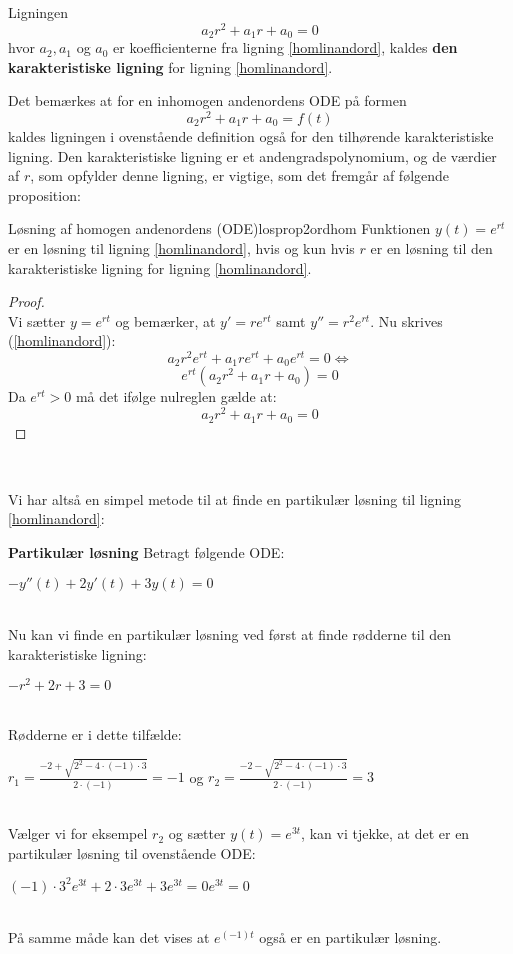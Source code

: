 \begin{definition}
Ligningen 
$$a_2r^2+a_1r+a_0=0$$
hvor $a_2, a_1$ og $a_0$ er koefficienterne fra ligning \eqref{homlinandord}, kaldes \textbf{den karakteristiske ligning} for ligning \eqref{homlinandord}.
\end{definition} 
\hfill \break
Det bemærkes at for en inhomogen andenordens ODE på formen
$$a_2r^2+a_1r+a_0=f(t)$$
kaldes ligningen i ovenstående definition også for den tilhørende karakteristiske ligning.
Den  karakteristiske ligning er et andengradspolynomium, og de værdier af $r$, som opfylder denne ligning, er vigtige, som det fremgår af følgende proposition: \hfill \break
\begin{prop}{Løsning af homogen andenordens (ODE)}{losprop2ordhom}\label{losprop2ordhom}
Funktionen $y(t)=e^{rt}$ er en løsning til ligning \eqref{homlinandord}, hvis og kun hvis $r$ er en løsning til den karakteristiske ligning for ligning \eqref{homlinandord}.
\end{prop}
\hfill \break
\begin{proof}\\
Vi sætter $y=e^{rt}$ og bemærker, at $y'=re^{rt}$ samt $y''=r^2e^{rt}$. Nu skrives (\ref{homlinandord}): \hfill \break
 $$a_2r^2e^{rt}+a_1re^{rt}+a_0e^{rt}=0 \Leftrightarrow$$ 
 $$e^{rt}(a_2r^2+a_1r+a_0)=0$$
 Da $e^{rt}>0$ må det ifølge nulreglen gælde at: \hfill \break
 $$a_2r^2+a_1r+a_0=0$$
\end{proof} \\ 
\hfill \break

Vi har altså en simpel metode til at finde en partikulær løsning til ligning \eqref{homlinandord}:\hfill \break

\begin{Example}\label{ekspartlos} \textbf{Partikulær løsning}\hfill \break
\textnormal{Betragt følgende ODE:}\\ \hfill \break
\centerline{$-y''(t)+2y'(t)+3y(t)=0$}\\ \hfill \break
\textnormal{Nu kan vi finde en partikulær løsning ved først at finde rødderne til den karakteristiske ligning:}\\ \hfill \break
\centerline{$-r^2+2r+3=0$}\\ \hfill \break
\textnormal{Rødderne er i dette tilfælde:}\\ \hfill \break
\centerline{$r_1=\frac{-2+\sqrt{2^2-4\cdot (-1)\cdot 3}}{2\cdot (-1)}=-1$ \textnormal{og} $r_2=\frac{-2-\sqrt{2^2-4\cdot (-1)\cdot 3}}{2\cdot (-1)}=3$} \\ \hfill \break
\textnormal{Vælger vi for eksempel $r_2$ og sætter $y(t)=e^{3t}$, kan vi tjekke, at det er en partikulær løsning til ovenstående ODE:}\\ \hfill \break
\centerline{$(-1)\cdot3^2e^{3t}+2\cdot 3e^{3t}+3e^{3t}=0e^{3t}=0$}\\ \hfill \break
\textnormal{På samme måde kan det vises at $e^{(-1)t}$ også er en partikulær løsning.}
\end{Example}\hfill \break

